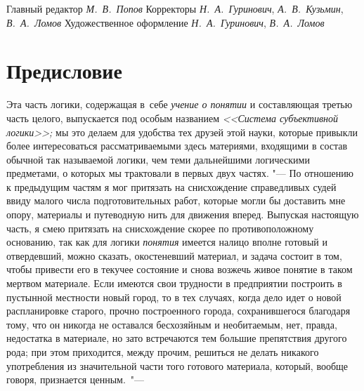Главный редактор {\em М.~В.~Попов}
Корректоры {\em Н.~А.~Гуринович}, {\em А.~В.~Кузьмин}, {\em В.~А.~Ломов}
Художественное оформление {\em Н.~А.~Гуринович}, {\em В.~А.~Ломов}

\bigskip

\clearpage
\chapter[Предисловие]{Предисловие}
Эта часть логики, содержащая в~себе {\em учение о понятии} и составляющая
третью часть целого, выпускается под особым названием {\em <<Система
субъективной логики>>;} мы это делаем для удобства тех друзей этой науки,
которые привыкли более интересоваться рассматриваемыми здесь материями,
входящими в состав обычной так называемой логики, чем теми дальнейшими
логическими предметами, о которых мы трактовали в первых двух частях. "---
По отношению к предыдущим частям я мог притязать на снисхождение
справедливых судей ввиду малого числа подготовительных работ, которые могли
бы доставить мне опору, материалы и путеводную нить для
движения вперед. Выпуская настоящую часть, я смею притязать на снисхождение
скорее по противоположному основанию, так как для логики {\em понятия} имеется
налицо вполне готовый и отвердевший, можно сказать, окостеневший материал,
и задача состоит в том, чтобы привести его в текучее состояние и снова
возжечь живое понятие в таком мертвом материале. Если имеются свои
трудности в предприятии построить в пустынной местности новый город, то в
тех случаях, когда дело идет о новой распланировке старого, прочно
построенного города, сохранившегося благодаря тому, что он никогда не
оставался бесхозяйным и необитаемым, нет, правда, недостатка в материале,
но зато встречаются тем большие препятствия другого рода; при этом
приходится, между прочим, решиться не делать никакого употребления из
значительной части того готового материала, который, вообще говоря,
признается ценным.~"---

